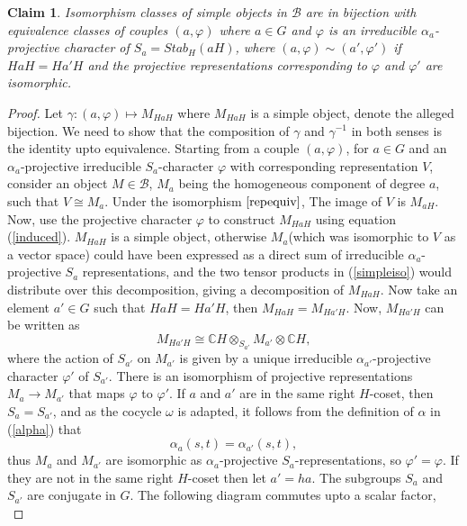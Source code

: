 \documentclass[11pt]{book}
\newtheorem{Claim}[theorem]{Claim}
\theoremstyle{Rem}
\theoremstyle{definition}
\numberwithin{equation}{section}
\newcommand\inv{^{-1}}
\newcommand\CC{\mathbb C}
\newcommand\B{\mathcal B}
\begin{document}
\begin{Claim}
Isomorphism classes of simple objects in $\B$ are in bijection with equivalence classes of couples $(a,\varphi)$ where $a\in G$ and $\varphi$ is an irreducible $\alpha_a$-projective character of $S_a = Stab_H(aH)$, where $(a, \varphi) \sim (a', \varphi')$ if $HaH = Ha'H$ and the projective representations corresponding to $\varphi$ and $\varphi'$ are isomorphic.
\end{Claim}
\begin{proof}
Let $\gamma: (a,\varphi)\mapsto M_{HaH}$ where $M_{HaH}$ is a simple object, denote the alleged bijection. We need to show that the composition of $\gamma$ and $\gamma\inv$ in both senses is the identity upto equivalence.
Starting from a couple $(a, \varphi)$, for $a\in G$ and an  $\alpha_a$-projective irreducible $S_a$-character $\varphi$ with corresponding representation $V$, consider an object $M \in \B$, $M_a$ being the homogeneous component of degree $a$, such that $V\cong M_a$. Under the isomorphism $\ref{repequiv}$, The image of $V$ is $M_{aH}$.  Now, use the projective character $\varphi$ to construct $M_{HaH}$ using equation (\ref{induced}). $M_{HaH}$ is a simple object, otherwise $M_{a}$(which was isomorphic to $V$ as a vector space) could have been expressed as a direct sum of irreducible $\alpha_a$-projective $S_a$ representations, and the two tensor products in (\ref{simpleiso}) would distribute over this decomposition, giving a decomposition of $M_{HaH}$. Now take an element $a'\in G$ such that $HaH = Ha'H$, then $M_{HaH} = M_{Ha'H}$. Now, $M_{Ha'H}$ can be written as \begin{equation}\label{gamma}
	M_{Ha'H} \cong \CC H \otimes_{S_{a'}} M_{a'} \otimes \CC H,
\end{equation} where the action of $S_{a'}$ on $M_{a'}$ is given by a unique irreducible $\alpha_{a'}$-projective character $\varphi'$ of $S_{a'}$. There is an isomorphism of projective representations $M_a\rightarrow M_{a'}$ that maps $\varphi$ to $\varphi'$. If $a$ and $a'$ are in the same right $H$-coset, then $S_a=S_{a'}$, and as the cocycle $\omega$ is adapted, it follows from the definition of $\alpha$ in (\ref{alpha}) that \begin{equation}
	\alpha_a(s, t) = \alpha_{a'}(s, t),
\end{equation} thus $M_a$ and $M_{a'}$ are isomorphic as $\alpha_a$-projective $S_a$-representations, so $\varphi' = \varphi$. If they are not in the same right $H$-coset then let $a' = ha$. The subgroups $S_a$ and $S_{a'}$ are conjugate in $G$. The following diagram commutes upto a scalar factor, \[
\]
\end{proof}
\end{document}
